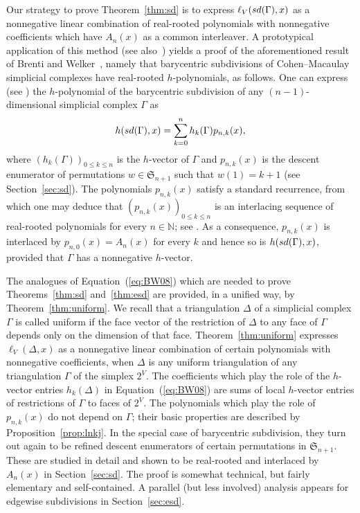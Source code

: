 \documentclass[11pt]{amsart}
\newcommand{\sd}{{\rm sd}}
\newcommand{\fS}{{\mathfrak S}}
\newcommand{\NN}{{\mathbb N}}
\begin{document}
Our strategy to prove Theorem~\ref{thm:sd} is to 
express $\ell_V(\sd(\Gamma),x)$ as a nonnegative linear 
combination of real-rooted polynomials with nonnegative
coefficients which have $A_n(x)$ as a common interleaver.
A prototypical application of this method (see 
also~\cite{CS07}) yields a proof of the aforementioned 
result of Brenti and Welker~\cite{BW08}, namely that 
barycentric subdivisions of Cohen--Macaulay simplicial 
complexes have real-rooted $h$-polynomials, as follows.
One can express (see \cite[Theorem~1]{BW08}) the 
$h$-polynomial of the barycentric subdivision of any 
$(n-1)$-dimensional simplicial complex $\Gamma$ as 
%
\begin{equation} \label{eq:BW08}
h(\sd(\Gamma), x) = \sum_{k=0}^n h_k(\Gamma) 
                     p_{n,k}(x), 
\end{equation}
%  
where $(h_k(\Gamma))_{0 \le k \le n}$ is the 
$h$-vector of $\Gamma$ and $p_{n,k}(x)$ is the 
descent enumerator of permutations $w \in \fS_{n+1}$ 
such that $w(1) = k+1$ (see Section~\ref{sec:sd}). 
The polynomials $p_{n,k}(x)$ satisfy a standard 
recurrence, from which one may deduce that 
$(p_{n,k}(x))_{0 \le k \le n}$ is an interlacing 
sequence of real-rooted polynomials for every $n \in 
\NN$; see \cite[Example~7.8.8]{Bra15}. As a 
consequence, $p_{n,k}(x)$ is interlaced by $p_{n,0}
(x) = A_n(x)$ for every $k$ and hence so is
$h(\sd(\Gamma), x)$, provided that $\Gamma$ has a 
nonnegative $h$-vector. 

The analogues of Equation~(\ref{eq:BW08}) which 
are needed to prove Theorems~\ref{thm:sd} 
and~\ref{thm:esd} are provided, in a unified way,
by Theorem~\ref{thm:uniform}. We recall that a 
triangulation $\Delta$ of a simplicial complex 
$\Gamma$ is called uniform \cite{Ath22} if the 
face vector of the restriction of $\Delta$ to any 
face of $\Gamma$ depends only on the dimension 
of that face. Theorem~\ref{thm:uniform} expresses 
$\ell_V(\Delta,x)$ as a nonnegative linear 
combination of certain polynomials with nonnegative 
coefficients, when $\Delta$ is any uniform 
triangulation of any triangulation $\Gamma$ of the 
simplex $2^V$. The coefficients which play the role 
of the $h$-vector entries $h_k(\Delta)$ in 
Equation~(\ref{eq:BW08}) are sums of local 
$h$-vector entries of restrictions of $\Gamma$ to 
faces of $2^V$. The polynomials 
which play the role of $p_{n,k}(x)$ do not depend 
on $\Gamma$; their basic properties are described 
by Proposition~\ref{prop:lnkj}. In the special case 
of barycentric subdivision, they turn out again to 
be refined descent enumerators of certain permutations 
in $\fS_{n+1}$. These are studied in detail and shown 
to be real-rooted and interlaced by $A_n(x)$ in 
Section~\ref{sec:sd}. The proof is somewhat technical,
but fairly elementary and self-contained. A parallel 
(but less involved) analysis appears for edgewise 
subdivisions in Section~\ref{sec:esd}.  
\end{document}
